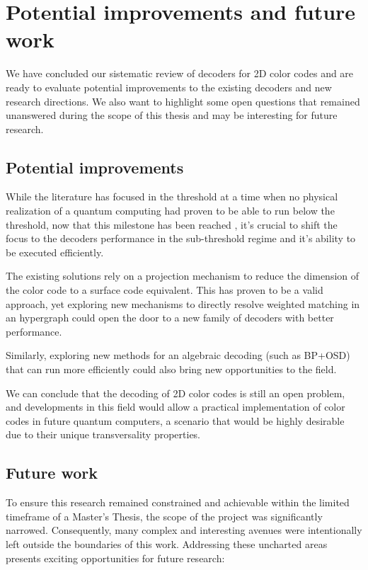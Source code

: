 \chapter{Potential improvements and future work}
\label{chap:potential_improvements}

We have concluded our sistematic review of decoders for 2D color codes and are ready to evaluate potential improvements to the existing decoders and new research directions. We also want to highlight some open questions that remained unanswered during the scope of this thesis and may be interesting for future research.

\section{Potential improvements}

While the literature has focused in the threshold at a time when no physical realization of a quantum computing had proven to be able to run below the threshold, now that this milestone has been reached \cite{Google_Willow_2024}, it's crucial to shift the focus to the decoders performance in the sub-threshold regime and it's ability to be executed efficiently.

The existing solutions rely on a projection mechanism to reduce the dimension of the color code to a surface code equivalent. This has proven to be a valid approach, yet exploring new mechanisms to directly resolve weighted matching in an hypergraph could open the door to a new family of decoders with better performance.

Similarly, exploring new methods for an algebraic decoding (such as BP+OSD) that can run more efficiently could also bring new opportunities to the field.

We can conclude that the decoding of 2D color codes is still an open problem, and developments in this field would allow a practical implementation of color codes in future quantum computers, a scenario that would be highly desirable due to their unique transversality properties.

\section{Future work}

To ensure this research remained constrained and achievable within the limited timeframe of a Master's Thesis, the scope of the project was significantly narrowed. Consequently, many complex and interesting avenues were intentionally left outside the boundaries of this work. Addressing these uncharted areas presents exciting opportunities for future research:

